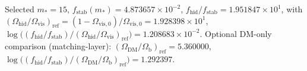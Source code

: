 Selected $m_\ast=15$, $f_\mathrm{stab}(m_\ast)=4.873657\times 10^{-2}$, $f_\mathrm{hid}/f_\mathrm{stab}=1.951847\times 10^{1}$, with $(\Omega_\mathrm{hid}/\Omega_\mathrm{vis})_\mathrm{ref}=(1-\Omega_{\mathrm{vis},0})/\Omega_{\mathrm{vis},0}=1.928398\times 10^{1}$, $\log\!\bigl((f_\mathrm{hid}/f_\mathrm{stab})/(\Omega_\mathrm{hid}/\Omega_\mathrm{vis})_\mathrm{ref}\bigr)=1.208683\times 10^{-2}$.
Optional DM-only comparison (matching-layer): $(\Omega_\mathrm{DM}/\Omega_\mathrm{b})_\mathrm{ref}=5.360000$, $\log\!\bigl((f_\mathrm{hid}/f_\mathrm{stab})/(\Omega_\mathrm{DM}/\Omega_\mathrm{b})_\mathrm{ref}\bigr)=1.292397$.